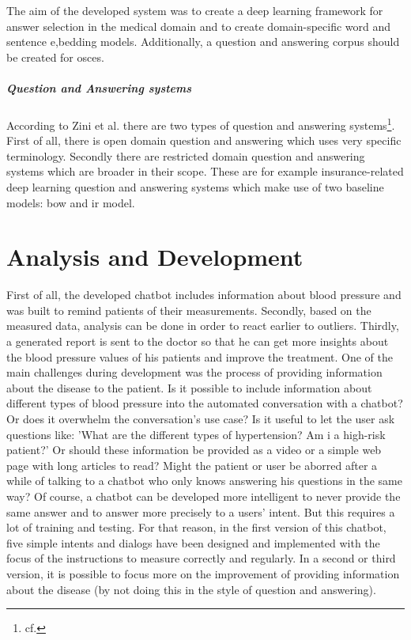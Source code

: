 The aim of the developed system was to create a deep learning framework for answer selection in the medical domain and to create domain-specific word and sentence e,bedding models. Additionally, a question and answering corpus should be created for \ac{osce}s.

\paragraph{Question and Answering systems}
According to Zini et al. there are two types of question and answering systems\footnote{cf.\autocite{zini}}. First of all, there is open domain question and answering which uses very specific terminology. Secondly there are restricted domain question and answering systems which are broader in their scope. These are for example insurance-related deep learning question and answering systems which make use of two baseline models: \ac{bow} and \ac{ir} model. 


\chapter{Analysis and Development}

First of all, the developed chatbot includes information about blood pressure and was built to remind patients of their measurements. Secondly, based on the measured data, analysis can be done in order to react earlier to outliers. Thirdly, a generated report is sent to the doctor so that he can get more insights about the blood pressure values of his patients and improve the treatment.
One of the main challenges during development was the process of providing information about the disease to the patient. Is it possible to include information about different types of blood pressure into the automated conversation with a chatbot? Or does it overwhelm the conversation's use case? Is it useful to let the user ask questions like: 'What are the different types of hypertension? Am i a high-risk patient?' 
Or should these information be provided as a video or a simple web page with long articles to read? Might the patient or user be aborred after a while of talking to a chatbot who only knows answering his questions in the same way?
Of course, a chatbot can be developed more intelligent to never provide the same answer and to answer more precisely to a users' intent. But this requires a lot of training and testing. 
For that reason, in the first version of this chatbot, five simple intents and dialogs have been designed and implemented with the focus of the instructions to measure correctly and regularly. 
In a second or third version, it is possible to focus more on the improvement of providing information about the disease (by not doing this in the style of question and answering).

